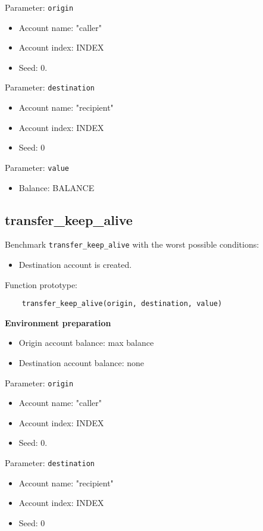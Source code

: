 \documentclass[11pt,a4paper]{article}
\begin{document}
Parameter: \verb|origin|
\begin{itemize}
\item Account name: "caller"
\item Account index: INDEX
\item Seed: 0.
\end{itemize}

Parameter: \verb|destination|
\begin{itemize}
\item Account name: "recipient"
\item Account index: INDEX
\item Seed: 0
\end{itemize}

Parameter: \verb|value|
\begin{itemize}
\item Balance: BALANCE
\end{itemize}

\subsection{transfer\_keep\_alive}

Benchmark \verb|transfer_keep_alive| with the worst possible conditions:
\begin{itemize}
\item Destination account is created.
\end{itemize}

Function prototype:

\begin{verbatim}
    transfer_keep_alive(origin, destination, value)
\end{verbatim}

\textbf{Environment preparation}
\begin{itemize}
\item Origin account balance: max balance
\item Destination account balance: none
\end{itemize}

Parameter: \verb|origin|
\begin{itemize}
\item Account name: "caller"
\item Account index: INDEX
\item Seed: 0.
\end{itemize}

Parameter: \verb|destination|
\begin{itemize}
\item Account name: "recipient"
\item Account index: INDEX
\item Seed: 0
\end{itemize}
\end{document}
